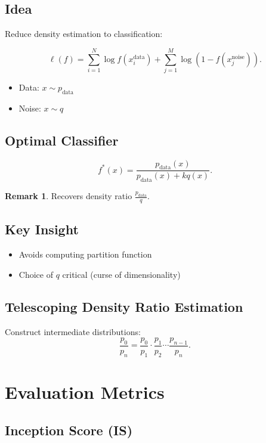 \documentclass[12pt,oneside]{book}
\numberwithin{equation}{section}
\theoremstyle{definition}
\newtheorem{remark}{Remark}[section]
\theoremstyle{plain}
\theoremstyle{remark}
\begin{document}
\subsection{Idea}

Reduce density estimation to classification:

\[
\ell(f) =
\sum_{i=1}^N \log f(x_i^{\text{data}})
+ \sum_{j=1}^M \log(1 - f(x_j^{\text{noise}})).
\]

\begin{itemize}
    \item Data: $x \sim p_{\text{data}}$
    \item Noise: $x \sim q$
\end{itemize}

\subsection{Optimal Classifier}

\[
f^*(x) = \frac{p_{\text{data}}(x)}{p_{\text{data}}(x) + k q(x)}.
\]

\begin{remark}
Recovers density ratio $\frac{p_{\text{data}}}{q}$.
\end{remark}

\subsection{Key Insight}

\begin{itemize}
    \item Avoids computing partition function
    \item Choice of $q$ critical (curse of dimensionality)
\end{itemize}

\subsection{Telescoping Density Ratio Estimation}

Construct intermediate distributions:
\[
\frac{p_0}{p_n}
=
\frac{p_0}{p_1}
\cdot
\frac{p_1}{p_2}
\cdots
\frac{p_{n-1}}{p_n}.
\]

\section{Evaluation Metrics}

\subsection{Inception Score (IS)}
\end{document}
